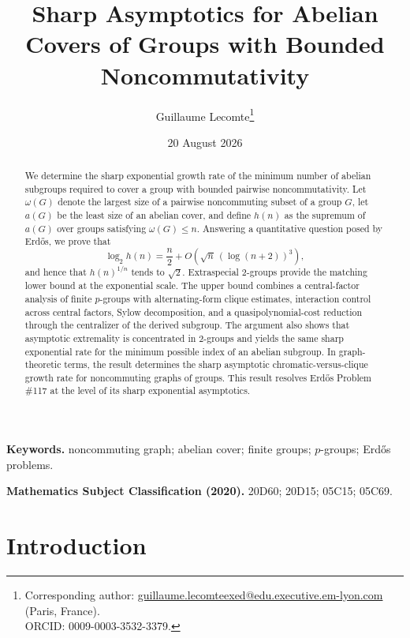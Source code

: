 \documentclass[11pt]{article}
\title{Sharp Asymptotics for Abelian Covers of Groups with Bounded Noncommutativity}
\author{Guillaume Lecomte\thanks{Corresponding author: \href{mailto:guillaume.lecomteexed@edu.executive.em-lyon.com}{guillaume.lecomteexed@edu.executive.em-lyon.com} (Paris, France).\\ORCID: 0009-0003-3532-3379.}}
\date{20 August 2026}
\theoremstyle{definition}
\theoremstyle{remark}
\begin{document}
\maketitle

\begin{abstract}
We determine the sharp exponential growth rate of the minimum number of abelian subgroups required to cover a group with bounded pairwise noncommutativity. Let $\omega(G)$ denote the largest size of a pairwise noncommuting subset of a group $G$, let $a(G)$ be the least size of an abelian cover, and define $h(n)$ as the supremum of $a(G)$ over groups satisfying $\omega(G)\le n$. Answering a quantitative question posed by Erd\H{o}s, we prove that
\[
\log_2 h(n)=\frac n2+O\!\left(\sqrt n\,(\log(n+2))^3\right),
\]
and hence that $h(n)^{1/n}$ tends to $\sqrt2$. Extraspecial $2$-groups provide the matching lower bound at the exponential scale. The upper bound combines a central-factor analysis of finite $p$-groups with alternating-form clique estimates, interaction control across central factors, Sylow decomposition, and a quasipolynomial-cost reduction through the centralizer of the derived subgroup. The argument also shows that asymptotic extremality is concentrated in $2$-groups and yields the same sharp exponential rate for the minimum possible index of an abelian subgroup. In graph-theoretic terms, the result determines the sharp asymptotic chromatic-versus-clique growth rate for noncommuting graphs of groups. This result resolves Erd\H{o}s Problem \#117 at the level of its sharp exponential asymptotics.
\end{abstract}

\noindent\textbf{Keywords.} noncommuting graph; abelian cover; finite groups; $p$-groups; Erd\H{o}s problems.

\medskip
\noindent\textbf{Mathematics Subject Classification (2020).} 20D60; 20D15; 05C15; 05C69.

\section{Introduction}
\end{document}
